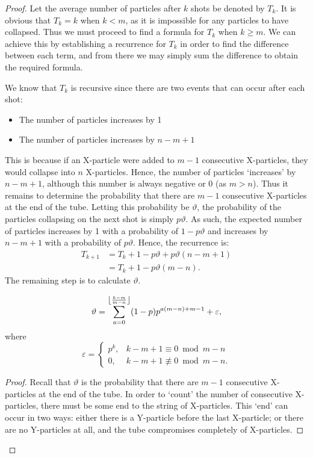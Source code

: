 \begin{proof}
  Let the average number of particles after $k$ shots be denoted by $T_k$. It is obvious that $T_k = k$ when $k < m$, as it is impossible for any particles to have collapsed. Thus we must proceed to find a formula for $T_k$ when $k \ge m$. We can achieve this by establishing a recurrence for $T_k$ in order to find the difference between each term, and from there we may simply sum the difference to obtain the required formula. 

  We know that $T_k$ is recursive since there are two events that can occur after each shot:
  \begin{itemize}
    \item The number of particles increases by 1
    \item The number of particles increases by $n-m+1$
  \end{itemize}
  This is because if an X-particle were added to $m-1$ consecutive X-particles, they would collapse into $n$ X-particles. Hence, the number of particles `increases' by $n-m+1$, although this number is always negative or 0 (as $m > n$). Thus it remains to determine the probability that there are $m-1$ consecutive X-particles at the end of the tube. Letting this probability be $\vartheta$, the probability of the particles collapsing on the next shot is simply $p\vartheta$. As such, the expected number of particles increases by 1 with a probability of  $1-p\vartheta$ and increases by  $n-m+1$ with a probability of $p\vartheta$. Hence, the recurrence is:
  \begin{align}
    T_{k+1} &= T_{k} + 1 - p\vartheta + p\vartheta(n-m+1) \nonumber \\
            &= T_{k} + 1 - p\vartheta(m-n). \label{eq:1}
  \end{align}
  The remaining step is to calculate $\vartheta$.
  \begin{claim}
    \begin{equation*}
      \vartheta = \sum_{a=0}^{\floor*{\frac{k-m}{m-n}}} (1-p)p^{a(m-n)+m-1} + \varepsilon,
    \end{equation*}
    where \[\varepsilon = \begin{cases} p^{k}, &k-m+1 \equiv 0 \bmod m-n \\ 0, &k-m+1 \not\equiv 0 \bmod m-n. \end{cases}\]
  \end{claim}
  \begin{proof}
    Recall that $\vartheta$ is the probability that there are $m-1$ consecutive X-particles at the end of the tube. In order to `count' the number of consecutive X-particles, there must be some end to the string of X-particles. This `end' can occur in two ways: either there is a Y-particle before the last X-particle; or there are no Y-particles at all, and the tube compromises completely of X-particles.

\end{proof}
\end{proof}
